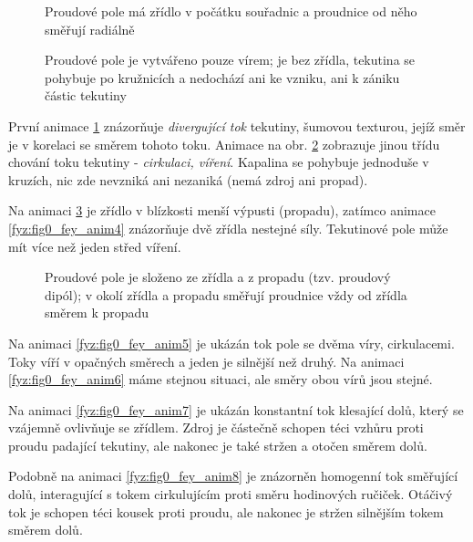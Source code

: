       \begin{figure}[ht!]
        \centering
        \caption{Proudové pole má zřídlo v počátku souřadnic a proudnice od něho směřují radiálně} 
        \label{fyz:fig0_fey_anim1}
      \end{figure}
  
      \begin{figure}[ht!]
        \centering 
        \caption{Proudové pole je vytvářeno pouze vírem; je bez zřídla, tekutina se pohybuje po 
                  kružnicích a nedochází ani ke vzniku, ani k zániku částic tekutiny} 
        \label{fyz:fig0_fey_anim2}
      \end{figure}
      
      První animace \ref{fyz:fig0_fey_anim1} znázorňuje \emph{divergující tok} tekutiny, šumovou 
      texturou, jejíž směr je v korelaci se směrem tohoto toku. Animace na obr. 
      \ref{fyz:fig0_fey_anim2} zobrazuje jinou třídu chování toku tekutiny  - \emph{cirkulaci, 
      víření}. Kapalina se pohybuje jednoduše v kruzích, nic zde nevzniká ani nezaniká (nemá zdroj 
      ani propad).   
  
      Na animaci \ref{fyz:fig0_fey_anim3} je zřídlo v blízkosti menší výpusti (propadu), zatímco 
      animace \ref{fyz:fig0_fey_anim4} znázorňuje dvě zřídla nestejné síly. Tekutinové pole může mít 
      více než jeden střed víření. 
  
      \begin{figure}[ht!]
        \centering
        \caption{Proudové pole je složeno ze zřídla a z propadu (tzv. proudový dipól); v okolí 
                  zřídla a propadu směřují proudnice vždy od zřídla směrem k propadu}
        \label{fyz:fig0_fey_anim3}
      \end{figure}
  
      Na animaci \ref{fyz:fig0_fey_anim5} je ukázán tok pole se dvěma víry, cirkulacemi. Toky víří v
      opačných směrech a jeden je silnější než druhý. Na animaci \ref{fyz:fig0_fey_anim6} máme
      stejnou situaci, ale směry obou vírů jsou stejné.    
      
      Na animaci \ref{fyz:fig0_fey_anim7} je ukázán konstantní tok klesající dolů, který se vzájemně
      ovlivňuje se zřídlem. Zdroj je částečně schopen téci vzhůru proti proudu padající tekutiny,
      ale nakonec je také stržen a otočen směrem dolů.
      
      Podobně na animaci \ref{fyz:fig0_fey_anim8} je znázorněn homogenní tok směřující dolů,
      interagující s tokem cirkulujícím proti směru hodinových ručiček. Otáčivý tok je schopen téci
      kousek proti proudu, ale nakonec je stržen silnějším tokem směrem dolů.
  
